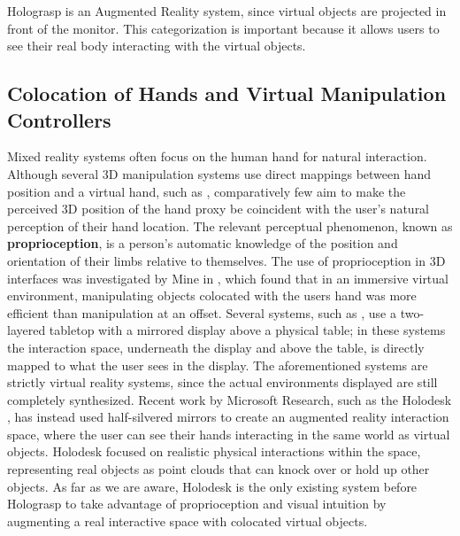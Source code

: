 \documentclass[pageno]{jpaper}
\begin{document}
Holograsp is an Augmented Reality system, since virtual objects are projected in front of the monitor. This categorization is important because it allows users to see their real body
interacting with the virtual objects.
\subsection{Colocation of Hands and Virtual Manipulation Controllers}
Mixed reality systems often focus on the human hand for natural interaction. 
Although several 3D manipulation systems use direct mappings between hand position and a virtual hand, such as \cite{poupyrev1996go},
comparatively few aim to make the perceived 3D position of the hand proxy be coincident with the user's natural perception of their
hand location. The relevant perceptual phenomenon, known as {\bf proprioception}, is a person's automatic knowledge of the position and orientation of their
limbs relative to themselves. The use of proprioception in 3D interfaces was investigated by Mine in \cite{mine1997exploiting}, which found that
in an immersive virtual environment, manipulating objects colocated with the users hand was more efficient than manipulation at an offset. Several systems,
such as \cite{mulder2002personal, prachyabrued2011dropping}, use a two-layered tabletop with a mirrored display above a physical table; in these systems the interaction space, underneath
the display and above the table, is directly mapped to what the user sees in the display. The aforementioned systems are strictly virtual reality systems, since the actual environments displayed
are still completely synthesized. Recent work by Microsoft Research, such as the Holodesk \cite{holodesk}, has instead used half-silvered mirrors to create an augmented reality
interaction space, where the user can see their hands interacting in the same world as virtual objects. Holodesk focused on realistic physical interactions within the space,
representing real objects as point clouds that can knock over or hold up other objects. As far as we are aware, Holodesk is the only existing system before Holograsp to take advantage of 
proprioception and visual intuition by augmenting a real interactive space with colocated virtual objects. 
\end{document}
